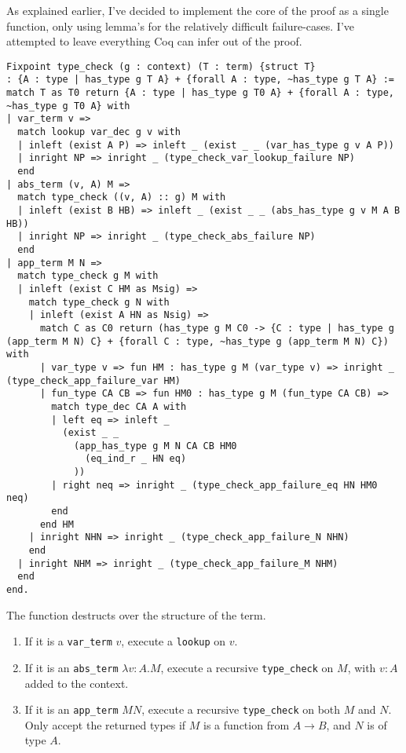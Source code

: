 \documentclass[a4paper, 10pt]{amsart}
\begin{document}
		As explained earlier, I've decided to implement the core of the proof as a single function, only using lemma's for the relatively difficult failure-cases.
		I've attempted to leave everything Coq can infer out of the proof.
\begin{lstlisting}
Fixpoint type_check (g : context) (T : term) {struct T}
: {A : type | has_type g T A} + {forall A : type, ~has_type g T A} :=
match T as T0 return {A : type | has_type g T0 A} + {forall A : type, ~has_type g T0 A} with
| var_term v =>
  match lookup var_dec g v with
  | inleft (exist A P) => inleft _ (exist _ _ (var_has_type g v A P))
  | inright NP => inright _ (type_check_var_lookup_failure NP)
  end
| abs_term (v, A) M =>
  match type_check ((v, A) :: g) M with
  | inleft (exist B HB) => inleft _ (exist _ _ (abs_has_type g v M A B HB))
  | inright NP => inright _ (type_check_abs_failure NP)
  end
| app_term M N =>
  match type_check g M with
  | inleft (exist C HM as Msig) =>
    match type_check g N with
    | inleft (exist A HN as Nsig) =>
      match C as C0 return (has_type g M C0 -> {C : type | has_type g (app_term M N) C} + {forall C : type, ~has_type g (app_term M N) C}) with
      | var_type v => fun HM : has_type g M (var_type v) => inright _ (type_check_app_failure_var HM)
      | fun_type CA CB => fun HM0 : has_type g M (fun_type CA CB) =>
        match type_dec CA A with
        | left eq => inleft _
          (exist _ _
            (app_has_type g M N CA CB HM0
              (eq_ind_r _ HN eq)
            ))
        | right neq => inright _ (type_check_app_failure_eq HN HM0 neq)
        end
      end HM
    | inright NHN => inright _ (type_check_app_failure_N NHN)
    end
  | inright NHM => inright _ (type_check_app_failure_M NHM)
  end
end.
\end{lstlisting}

	The function destructs over the structure of the term.
	\begin{enumerate}
		\item If it is a \lstinline{var_term} $v$, execute a \lstinline{lookup} on $v$.
		\item If it is an \lstinline{abs_term} $\lambda v:A . M$, execute a recursive \lstinline{type_check} on $M$, with $v:A$ added to the context.
		\item If it is an \lstinline{app_term} $M N$, execute a recursive \lstinline{type_check} on both $M$ and $N$.
			Only accept the returned types if $M$ is a function from $A \rightarrow B$, and $N$ is of type $A$.
	\end{enumerate}
	
\end{document}
